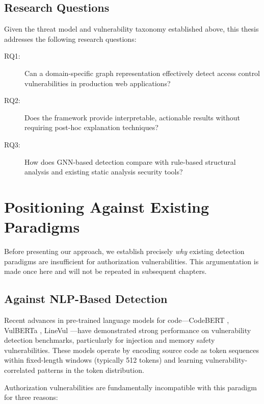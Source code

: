 \subsection{Research Questions}

Given the threat model and vulnerability taxonomy established above, this thesis addresses the following research questions:

\begin{description}
    \item[RQ1:] Can a domain-specific graph representation effectively detect access control vulnerabilities in production web applications?
    \item[RQ2:] Does the framework provide interpretable, actionable results without requiring post-hoc explanation techniques?
    \item[RQ3:] How does GNN-based detection compare with rule-based structural analysis and existing static analysis security tools?
\end{description}

\section{Positioning Against Existing Paradigms}
\label{sec:positioning}

Before presenting our approach, we establish precisely \emph{why} existing detection paradigms are insufficient for authorization vulnerabilities. This argumentation is made once here and will not be repeated in subsequent chapters.

\subsection{Against NLP-Based Detection}

Recent advances in pre-trained language models for code—CodeBERT \cite{feng2020codebert}, VulBERTa \cite{hanif2022vulberta}, LineVul \cite{fu2022linevul}—have demonstrated strong performance on vulnerability detection benchmarks, particularly for injection and memory safety vulnerabilities. These models operate by encoding source code as token sequences within fixed-length windows (typically 512 tokens) and learning vulnerability-correlated patterns in the token distribution.

Authorization vulnerabilities are fundamentally incompatible with this paradigm for three reasons:


